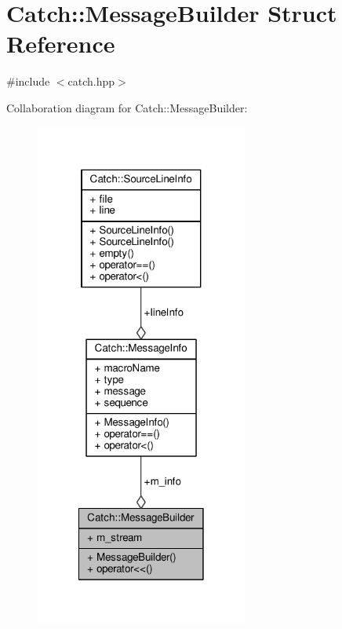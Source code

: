 \hypertarget{struct_catch_1_1_message_builder}{\section{Catch\-:\-:Message\-Builder Struct Reference}
\label{struct_catch_1_1_message_builder}
}


{\ttfamily \#include $<$catch.\-hpp$>$}



Collaboration diagram for Catch\-:\-:Message\-Builder\-:
\nopagebreak
\begin{figure}[H]
\begin{center}
\leavevmode
\includegraphics[width=198pt]{struct_catch_1_1_message_builder__coll__graph}
\end{center}
\end{figure}
